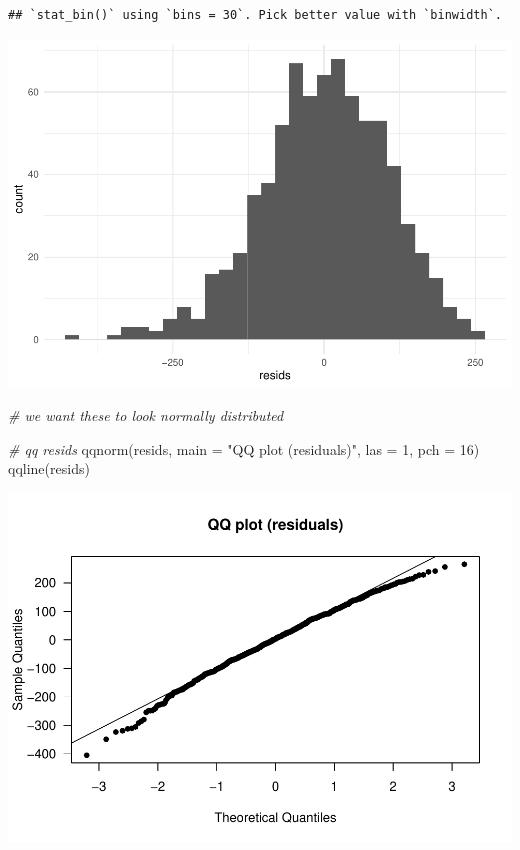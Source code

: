 \documentclass[
]{article}
\newenvironment{Shaded}{\begin{snugshade}}{\end{snugshade}}
\newcommand{\AttributeTok}[1]{\textcolor[rgb]{0.77,0.63,0.00}{#1}}
\newcommand{\CommentTok}[1]{\textcolor[rgb]{0.56,0.35,0.01}{\textit{#1}}}
\newcommand{\DecValTok}[1]{\textcolor[rgb]{0.00,0.00,0.81}{#1}}
\newcommand{\FunctionTok}[1]{\textcolor[rgb]{0.00,0.00,0.00}{#1}}
\newcommand{\NormalTok}[1]{#1}
\newcommand{\StringTok}[1]{\textcolor[rgb]{0.31,0.60,0.02}{#1}}
\begin{document}
\begin{verbatim}
## `stat_bin()` using `bins = 30`. Pick better value with `binwidth`.
\end{verbatim}

\includegraphics{SCMU_egg_model_files/figure-latex/null_model-2.pdf}

\begin{Shaded}
\begin{Highlighting}[]
\CommentTok{\# we want these to look normally distributed}

\CommentTok{\# qq resids}
\FunctionTok{qqnorm}\NormalTok{(resids, }\AttributeTok{main =} \StringTok{"QQ plot (residuals)"}\NormalTok{, }\AttributeTok{las =} \DecValTok{1}\NormalTok{, }\AttributeTok{pch =} \DecValTok{16}\NormalTok{)}
\FunctionTok{qqline}\NormalTok{(resids)}
\end{Highlighting}
\end{Shaded}

\includegraphics{SCMU_egg_model_files/figure-latex/null_model-3.pdf}
\end{document}
